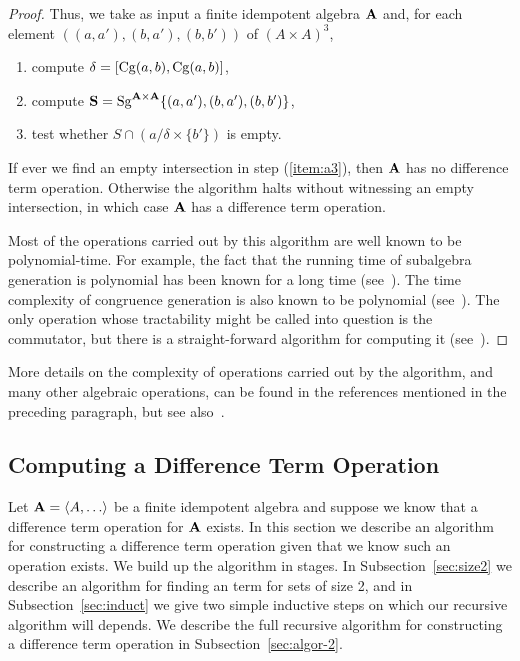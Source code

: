 \begin{proof}
    Thus, we take as input a finite idempotent algebra $\mathbf{A}$ and, 
    for each element $((a,a'), (b,a'), (b,b'))$ of $(A\times A)^3$,
    \begin{enumerate}
      \item compute $\delta = [\operatorname{Cg}(a,b), \operatorname{Cg}(a,b)]$, 
      \item compute $\mathbf{S} = \operatorname{Sg}^{\mathbf{A}\times \mathbf{A}}\{(a,a'), (b,a'), (b,b')\}$,
      \item \label{item:a3} test whether $S \cap (a/\delta \times \{b'\})$ is empty.
    \end{enumerate}
    If ever we find an empty intersection in step (\ref{item:a3}), then
    $\mathbf{A}$ has no difference term operation.
    Otherwise the algorithm halts without witnessing an empty
    intersection, in which case $\mathbf{A}$ has a difference term operation.

    Most of the operations carried out by this algorithm are well known to be
    polynomial-time.  For example, the fact that the running time of 
    subalgebra generation is polynomial has been known for a long time (see~\cite{MR0455543}).
    The time complexity of congruence generation is also known to be polynomial
    (see~\cite{MR2470585}).  The only operation whose tractability might be
    called into question is the commutator, but there is a straight-forward
    algorithm for computing it (see~\cite{2017arXiv170302764D}).
\end{proof}


More details on the complexity of operations carried out by the algorithm, and
many other algebraic operations, can be found in the references mentioned in the preceding paragraph, but see also~\cite{MR1871085,MR1695293,Freese:2009}.

\subsection{Computing a Difference Term Operation}
Let $\alg{A} = \<A, \dots\>$ be a finite idempotent algebra and suppose we 
know that a difference term operation for $\mathbf{A}$ exists.  In this section we
describe an algorithm for constructing a difference term operation given that 
we know such an operation exists. 
We build up the algorithm in stages. In Subsection~\ref{sec:size2} we
describe an algorithm for finding an \ld term for sets of size 2, and 
in Subsection~\ref{sec:induct} we give two simple inductive steps 
on which our recursive algorithm will depends.
We describe the full recursive algorithm for constructing a difference term 
operation in Subsection~\ref{sec:algor-2}.

